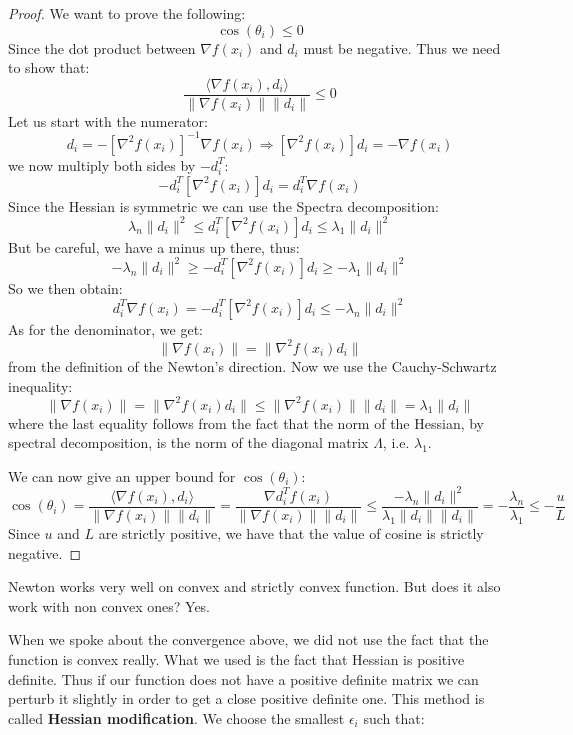 \begin{proof}
We want to prove the following:
\[
    \cos(\theta_i) \leq 0
\]
Since the dot product between $\nabla f(x_i)$ and $d_i$ must be negative. Thus we need to show that:
\[
    \frac{\langle \nabla f(x_i), d_i \rangle}{\lVert \nabla f(x_i) \rVert \lVert d_i \rVert} \leq 0
\]
Let us start with the numerator:
\[
    d_i = - [\nabla ^ 2 f(x_i)]^{-1} \nabla f(x_i) \Rightarrow [\nabla ^ 2 f(x_i)] d_i = - \nabla f(x_i)
\]
we now multiply both sides by $- d_i^T$:
\[
    - d_i^T[\nabla ^ 2 f(x_i)] d_i = d_i^T \nabla f(x_i)
\]
Since the Hessian is symmetric we can use the Spectra decomposition:
\[
    \lambda_n \lVert d_i \rVert ^ 2 \leq d_i^T[\nabla ^ 2 f(x_i)] d_i \leq \lambda_1 \lVert d_i \rVert ^ 2
\]
But be careful, we have a minus up there, thus:
\[
    - \lambda_n \lVert d_i \rVert ^ 2 \geq - d_i^T[\nabla ^ 2 f(x_i)] d_i \geq - \lambda_1 \lVert d_i \rVert ^ 2
\]
So we then obtain:
\[
    d_i^T \nabla f(x_i) = - d_i^T[\nabla ^ 2 f(x_i)] d_i \leq - \lambda_n \lVert d_i \rVert ^ 2
\]
As for the denominator, we get:
\[
    \lVert \nabla f(x_i) \rVert = \lVert \nabla ^ 2 f(x_i) d_i \rVert
\]
from the definition of the Newton's direction. Now we use the Cauchy-Schwartz inequality:
\[
    \lVert \nabla f(x_i) \rVert = \lVert \nabla ^ 2 f(x_i) d_i \rVert \leq \lVert \nabla ^ 2 f(x_i) \rVert \lVert d_i \rVert = \lambda_1 \lVert d_i \rVert
\]
where the last equality follows from the fact that the norm of the Hessian, by spectral decomposition, is the norm of the diagonal matrix $\Lambda$, i.e. $\lambda_1$.
\par We can now give an upper bound for $\cos(\theta_i)$:
\[
    \cos(\theta_i) = \frac{\langle \nabla f(x_i), d_i \rangle}{\lVert \nabla f(x_i) \rVert \lVert d_i \rVert} = \frac{\nabla d_i^T f(x_i)}{\lVert \nabla f(x_i) \rVert \lVert d_i \rVert} \leq \frac{- \lambda_n \lVert d_i \rVert ^ 2}{\lambda_1 \lVert d_i \rVert \lVert d_i \rVert} = - \frac{\lambda_n}{\lambda_1} \leq - \frac{u}{L}
\]
Since $u$ and $L$ are strictly positive, we have that the value of cosine is strictly negative.
\end{proof}
\par Newton works very well on convex and strictly convex function. But does it also work with non convex ones? Yes.
\par When we spoke about the convergence above, we did not use the fact that the function is convex really. What we used is the fact that Hessian is positive definite. Thus if our function does not have a positive definite matrix we can perturb it slightly in order to get a close positive definite one. This method is called \textbf{Hessian modification}. We choose the smallest $\epsilon_i$ such that:
